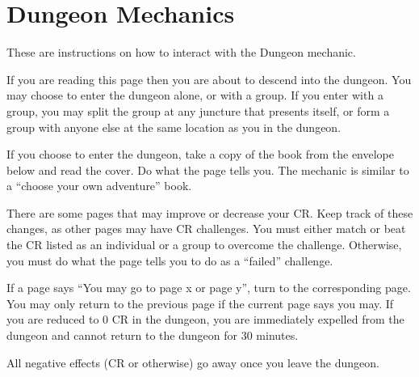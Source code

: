 \documentclass[green]{guildcamp2}
\begin{document}
\name{\gDungeonDirections{}}

\section{Dungeon Mechanics}
These are instructions on how to interact with the Dungeon mechanic.

\begin{enum}[Directions]
	\item If you are reading this page then you are about to descend into the dungeon. You may choose to enter the dungeon alone, or with a group. If you enter with a group, you may split the group at any juncture that presents itself, or form a group with anyone else at the same location as you in the dungeon.
	\item If you choose to enter the dungeon, take a copy of the book from the envelope below and read the cover. Do what the page tells you. The mechanic is similar to a ``choose your own adventure'' book. 
	\item There are some pages that may improve or decrease your CR. Keep track of these changes, as other pages may have  CR challenges. You must either match or beat the CR listed as an individual or a group to overcome the challenge. Otherwise, you must do what the page tells you to do as a ``failed'' challenge. 
	\item If a page says ``You may go to page x or page y'', turn to the corresponding page. You may only return to the previous page if the current page says you may. If you are reduced to 0 CR in the dungeon, you are immediately expelled from the dungeon and cannot return to the dungeon for 30 minutes. 
	\item All negative effects (CR or otherwise) go away once you leave the dungeon.
\end{enum}
	
\end{document}
